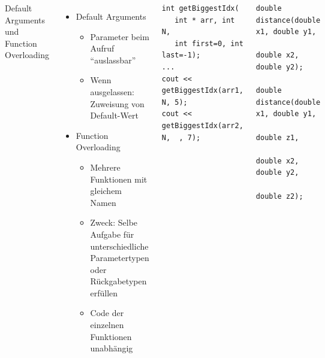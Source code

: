 \begin{frame}[fragile]
%
\begin{columns}[T]
\begin{Large}
{Default Arguments und Function Overloading}
\vspace{10pt}
\end{Large}
%
\begin{itemize}
\item Default Arguments
	\begin{itemize}
	\item Parameter beim Aufruf \enquote{auslassbar}
	\item Wenn ausgelassen: Zuweisung von Default-Wert
	\end{itemize}
\item Function Overloading
	\begin{itemize}
	\item Mehrere Funktionen mit gleichem Namen
	\item Zweck: Selbe Aufgabe für unterschiedliche Parametertypen oder Rückgabetypen erfüllen
	\item Code der einzelnen Funktionen unabhängig
	\end{itemize}

\end{itemize}
\begin{codebox}
\begin{verbatim}
int getBiggestIdx(
   int * arr, int N, 
   int first=0, int last=-1);
...
cout << getBiggestIdx(arr1, N, 5);
cout << getBiggestIdx(arr2, N,  , 7);
\end{verbatim}
\end{codebox}
%
\begin{codebox}
\begin{verbatim}
double distance(double x1, double y1,
                double x2, double y2);

double distance(double x1, double y1, 
                double z1,
                double x2, double y2, 
                double z2);
\end{verbatim}
\end{codebox}
\end{columns}
%
\end{frame}


